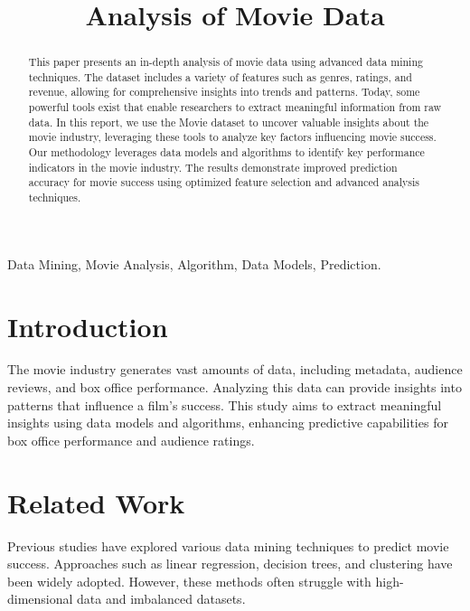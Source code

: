 \documentclass[conference]{IEEEtran}
\begin{document}
\title{Analysis of Movie Data \vspace{-2mm}}

\author{
}

\maketitle

\begin{abstract}
This paper presents an in-depth analysis of movie data using advanced data mining techniques. The dataset includes a variety of features such as genres, ratings, and revenue, allowing for comprehensive insights into trends and patterns. Today, some powerful tools exist that enable researchers to extract meaningful information from raw data. In this report, we use the Movie dataset to uncover valuable insights about the movie industry, leveraging these tools to analyze key factors influencing movie success. Our methodology leverages data models and algorithms to identify key performance indicators in the movie industry. The results demonstrate improved prediction accuracy for movie success using optimized feature selection and advanced analysis techniques.
\end{abstract}

\begin{IEEEkeywords}
Data Mining, Movie Analysis, Algorithm, Data Models, Prediction.
\end{IEEEkeywords}

\section{Introduction}
The movie industry generates vast amounts of data, including metadata, audience reviews, and box office performance. Analyzing this data can provide insights into patterns that influence a film's success. This study aims to extract meaningful insights using data models and algorithms, enhancing predictive capabilities for box office performance and audience ratings.

\section{Related Work}
Previous studies have explored various data mining techniques to predict movie success. Approaches such as linear regression, decision trees, and clustering have been widely adopted. However, these methods often struggle with high-dimensional data and imbalanced datasets.
\end{document}
